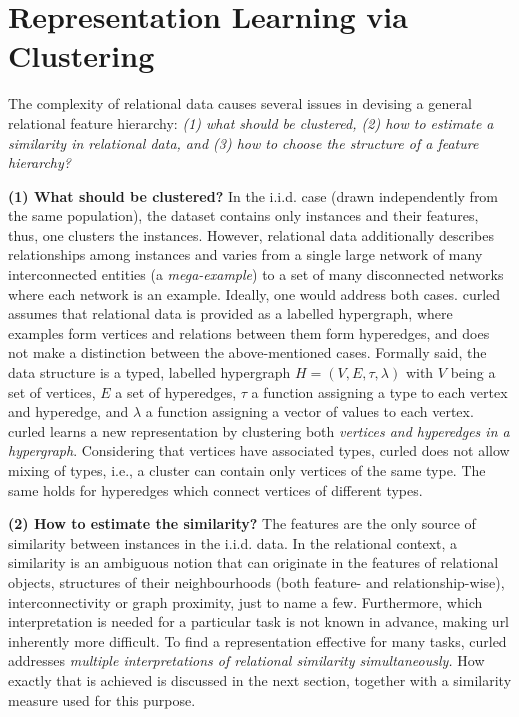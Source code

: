 \section{Representation Learning via Clustering}
\label{sec:RL}

The complexity of relational data causes several issues in devising a general relational feature hierarchy: \textit{(1) what should be clustered, (2) how to estimate a similarity in relational data, and (3) how to choose the structure of a feature hierarchy? }


\textbf{(1) What should be clustered?} 
In the i.i.d. case (drawn independently from the same population), the dataset contains only instances and their features, thus, one clusters the instances.
However, relational data additionally describes relationships among instances and  varies from a single large network of many interconnected entities (a \textit{mega-example}) to a set of many disconnected networks where each network is an example.
Ideally, one would address both cases.
\gls{curled} assumes that relational data is provided as a labelled hypergraph, where examples form vertices and relations between them form hyperedges, and does not make a distinction between the above-mentioned cases.
Formally said, the data structure is a typed, labelled hypergraph $H = (V,E, \tau, \lambda)$ with $V$ being a set of vertices, $E$ a set of hyperedges, $\tau$  a function  assigning a type to each vertex and hyperedge, and $\lambda$ a function assigning a vector of values to each vertex. 
\gls{curled} learns a new representation by clustering both \textit{vertices and hyperedges in a hypergraph}.
Considering that vertices have associated types, \gls{curled} does not allow mixing of types, i.e., a cluster can contain only vertices of the same type.
The same holds for hyperedges which connect vertices of different types. 





\textbf{(2) How to estimate the similarity?}
The features are the only source of similarity between instances in the i.i.d. data.
In the relational context, a similarity is an ambiguous notion that can originate in the  features of relational objects, structures of their neighbourhoods (both feature- and relationship-wise), interconnectivity or graph proximity, just to name a few.
Furthermore, which interpretation is needed for a particular task is not known in advance, making \gls{url} inherently more difficult.
To find a representation effective for many tasks, \gls{curled} addresses \textit{multiple interpretations of relational similarity simultaneously.}
How exactly that is achieved is discussed in the next section, together with a similarity measure used for this purpose.



